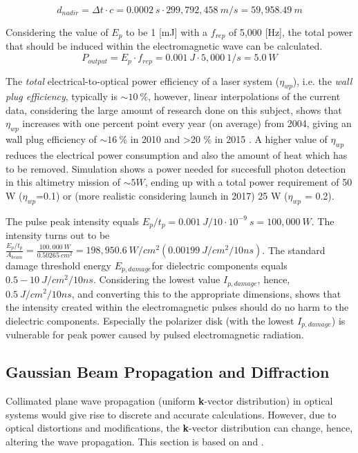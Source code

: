 \begin{equation}
\label{alongtracknadir}
d_{nadir} = \Delta t \cdot c = 0.0002\ s \cdot 299,792,458\ m/s = 59,958.49\ m
\end{equation}

Considering the value of $E_{p}$ to be 1 [mJ] with a $f_{rep}$ of 5,000 [Hz], the total power that should be induced within the electromagnetic wave can be calculated.
\begin{equation}
\label{outputpower}
P_{output} = E_{p} \cdot f_{rep} = 0.001\ J \cdot 5,000\ 1/s = 5.0\ W
\end{equation}

The \textit{total} electrical-to-optical power efficiency of a laser system ($\eta_{wp}$), i.e. the \textit{wall plug efficiency}, typically is $\sim 10\ \%$, however, linear interpolations of the current data, considering the large amount of research done on this subject, shows that $\eta_{wp}$ increases with one percent point every year (on average) from 2004, giving an wall plug efficiency of $\sim16\ \%$ in 2010 and \textgreater20 \% in 2015 \cite{nd_yag_life}. A higher value of $\eta_{wp}$ reduces the electrical power consumption and also the amount of heat which has to be removed. Simulation shows a power needed for succesfull photon detection in this altimetry mission of $\sim5 W$, ending up with a total power requirement of 50 W ($\eta_{wp}$=0.1) or (more realistic considering launch in 2017) 25 W ($\eta_{wp}$ = 0.2). 
  
The pulse peak intensity equals $E_{p}/t_{p} = 0.001\ J / 10\cdot10^{-9}\ s = 100,000\ W$. The intensity turns out to be $\frac{E_{p}/t_{p}}{A_{beam}} = \frac{100,000\ W}{0.50265\ cm^{2}} = 198,950.6\ W/cm^{2} (0.00199\ J/cm^{2}/10ns)$. The standard damage threshold energy $E_{p,damage}$for dielectric components equals $0.5 - 10\ J/cm^{2}/10ns$. Considering the lowest value $I_{p,damage}$, hence, $0.5\ J/cm^{2}/10ns$, and converting this to the appropriate dimensions, shows that the intensity created within the electromagnetic pulses should do no harm to the dielectric components. Especially the polarizer disk (with the lowest $I_{p,damage}$) is vulnerable for peak power caused by pulsed electromagnetic radiation. 

\subsection{Gaussian Beam Propagation and Diffraction}
	\label{diffraction}

\cite{fourieroptics}Collimated plane wave propagation (uniform \textbf{k}-vector distribution) in optical systems would give rise to discrete and accurate calculations. However, due to optical distortions and modifications, the \textbf{k}-vector distribution can change, hence, altering the wave propagation. This section is based on \cite{fourieroptics} and \cite{fourieroptics1}. 

